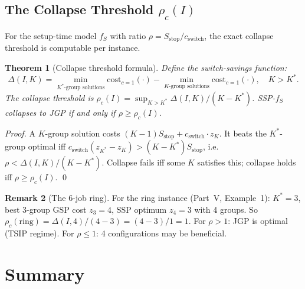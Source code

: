 \documentclass[11pt,a4paper]{article}
\theoremstyle{plain}
\newtheorem{theorem}{Theorem}[section]
\theoremstyle{definition}
\newtheorem{remark}[theorem]{Remark}
\newcommand{\Kstar}{K^*}
\begin{document}
\subsection{The Collapse Threshold $\rho_c(I)$}

For the setup-time model $f_S$ with ratio $\rho=S_\mathrm{stop}/c_\mathrm{switch}$,
the exact collapse threshold is computable per instance.

\begin{thmbox}
\begin{theorem}[Collapse threshold formula]
\label{thm:threshold}
Define the \emph{switch-savings function}:
\[
  \Delta(I,K) = \min_{\text{$\Kstar$-group solutions}} \mathrm{cost}_{c=1}(\cdot)
  - \min_{\text{$K$-group solutions}} \mathrm{cost}_{c=1}(\cdot),
  \quad K>\Kstar.
\]
The collapse threshold is $\rho_c(I)=\sup_{K>\Kstar}\Delta(I,K)/(K-\Kstar)$.
SSP-$f_S$ collapses to JGP if and only if $\rho\ge\rho_c(I)$.
\end{theorem}
\end{thmbox}

\begin{proofbox}
\begin{proof}
A $K$-group solution costs $(K-1)S_\mathrm{stop}+c_\mathrm{switch}\cdot z_K$.
It beats the $\Kstar$-group optimal iff
$c_\mathrm{switch}(z_{\Kstar}-z_K)>(K-\Kstar)S_\mathrm{stop}$,
i.e.\ $\rho<\Delta(I,K)/(K-\Kstar)$.
Collapse fails iff some $K$ satisfies this; collapse holds iff $\rho\ge\rho_c(I)$. \qed
\end{proof}
\end{proofbox}

\begin{remark}[The 6-job ring]
For the ring instance (Part~V, Example~1): $\Kstar=3$, best 3-group GSP cost
$z_3=4$, SSP optimum $z_4=3$ with 4 groups.
So $\rho_c(\text{ring})=\Delta(I,4)/(4-3)=(4-3)/1=1$.
For $\rho>1$: JGP is optimal (TSIP regime).
For $\rho\le1$: 4 configurations may be beneficial.
\end{remark}

\section{Summary}
\label{sec:summary}
\end{document}
